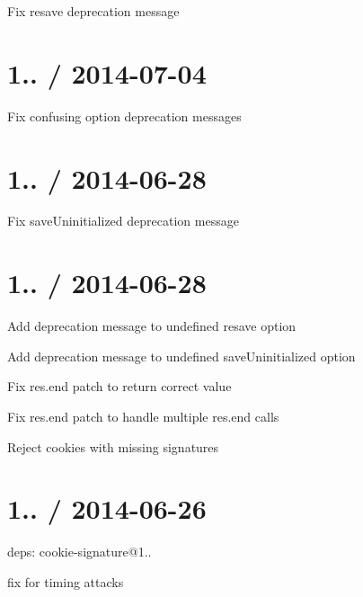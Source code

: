 \begin{DoxyItemize}
\item Fix resave deprecation message
\end{DoxyItemize}

\section*{1.. / 2014-\/07-\/04 }


\begin{DoxyItemize}
\item Fix confusing option deprecation messages
\end{DoxyItemize}

\section*{1.. / 2014-\/06-\/28 }


\begin{DoxyItemize}
\item Fix save\+Uninitialized deprecation message
\end{DoxyItemize}

\section*{1.. / 2014-\/06-\/28 }


\begin{DoxyItemize}
\item Add deprecation message to undefined {\ttfamily resave} option
\item Add deprecation message to undefined {\ttfamily save\+Uninitialized} option
\item Fix {\ttfamily res.\+end} patch to return correct value
\item Fix {\ttfamily res.\+end} patch to handle multiple {\ttfamily res.\+end} calls
\item Reject cookies with missing signatures
\end{DoxyItemize}

\section*{1.. / 2014-\/06-\/26 }


\begin{DoxyItemize}
\item deps\+: cookie-\/signature@1..
\begin{DoxyItemize}
\item fix for timing attacks
\end{DoxyItemize}
\end{DoxyItemize}


